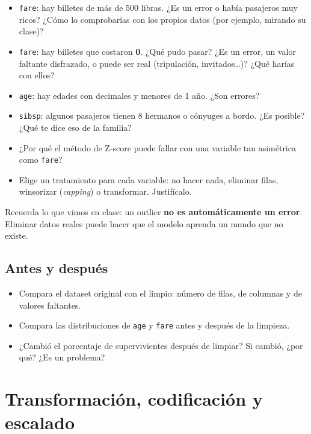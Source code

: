 \documentclass[11pt,a4paper]{article}
\newcommand{\col}[1]{\texttt{#1}}
\begin{document}
\begin{preguntas}
\begin{itemize}
  \item \col{fare}: hay billetes de más de 500 libras. ¿Es un error o había pasajeros muy
        ricos? ¿Cómo lo comprobarías con los propios datos (por ejemplo, mirando su clase)?
  \item \col{fare}: hay billetes que costaron \textbf{0}. ¿Qué pudo pasar? ¿Es un error,
        un valor faltante disfrazado, o puede ser real (tripulación, invitados\ldots)?
        ¿Qué harías con ellos?
  \item \col{age}: hay edades con decimales y menores de 1 año. ¿Son errores?
  \item \col{sibsp}: algunos pasajeros tienen 8 hermanos o cónyuges a bordo. ¿Es posible?
        ¿Qué te dice eso de la familia?
  \item ¿Por qué el método de Z-score puede fallar con una variable tan asimétrica como \col{fare}?
  \item Elige un tratamiento para cada variable: no hacer nada, eliminar filas, winsorizar
        (\emph{capping}) o transformar. Justifícalo.
\end{itemize}
\end{preguntas}

\begin{nota}
Recuerda lo que vimos en clase: un outlier \textbf{no es automáticamente un error}.
Eliminar datos reales puede hacer que el modelo aprenda un mundo que no existe.
\end{nota}

\subsection{Antes y después}
\begin{itemize}
  \item Compara el dataset original con el limpio: número de filas, de columnas y de
        valores faltantes.
  \item Compara las distribuciones de \col{age} y \col{fare} antes y después de la limpieza.
  \item ¿Cambió el porcentaje de supervivientes después de limpiar? Si cambió, ¿por qué?
        ¿Es un problema?
\end{itemize}

\section{Transformación, codificación y escalado}
\end{document}
